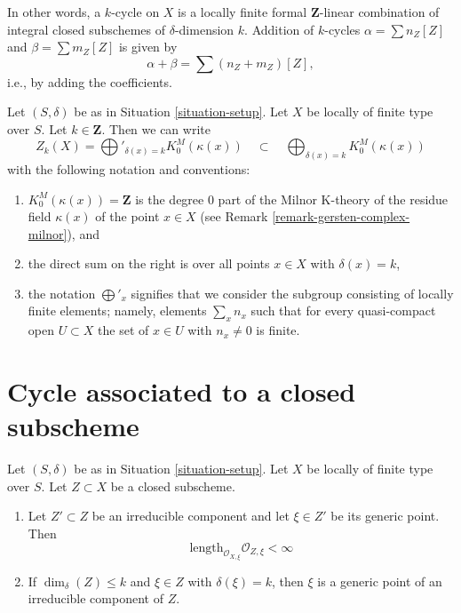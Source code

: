 \noindent
In other words, a $k$-cycle on $X$
is a locally finite formal $\mathbf{Z}$-linear
combination of integral closed subschemes of $\delta$-dimension $k$.
Addition of $k$-cycles $\alpha = \sum n_Z[Z]$ and
$\beta = \sum m_Z[Z]$ is given by
$$
\alpha + \beta = \sum (n_Z + m_Z)[Z],
$$
i.e., by adding the coefficients.

\begin{remark}
\label{remark-cycles-pointwise}
Let $(S, \delta)$ be as in Situation \ref{situation-setup}.
Let $X$ be locally of finite type over $S$. Let $k \in \mathbf{Z}$.
Then we can write
$$
Z_k(X) = \bigoplus'\nolimits_{\delta(x) = k} K_0^M(\kappa(x))
\quad\subset\quad
\bigoplus\nolimits_{\delta(x) = k} K_0^M(\kappa(x))
$$
with the following notation and conventions:
\begin{enumerate}
\item $K_0^M(\kappa(x)) = \mathbf{Z}$ is the degree $0$ part of
the Milnor K-theory of the residue field $\kappa(x)$ of the point
$x \in X$ (see Remark \ref{remark-gersten-complex-milnor}), and
\item the direct sum on the right is over all points $x \in X$
with $\delta(x) = k$,
\item the notation $\bigoplus'_x$ signifies that we consider the
subgroup consisting of locally finite elements; namely, elements
$\sum_x n_x$ such that for every quasi-compact open $U \subset X$
the set of $x \in U$ with $n_x \not = 0$ is finite.
\end{enumerate}
\end{remark}




\section{Cycle associated to a closed subscheme}
\label{section-cycle-of-closed-subscheme}

\begin{lemma}
\label{lemma-multiplicity-finite}
Let $(S, \delta)$ be as in Situation \ref{situation-setup}.
Let $X$ be locally of finite type over $S$.
Let $Z \subset X$ be a closed subscheme.
\begin{enumerate}
\item Let $Z' \subset Z$ be an irreducible component and
let $\xi \in Z'$ be its generic point.
Then
$$
\text{length}_{\mathcal{O}_{X, \xi}} \mathcal{O}_{Z, \xi} < \infty
$$
\item If $\dim_\delta(Z) \leq k$ and $\xi \in Z$ with
$\delta(\xi) = k$, then $\xi$ is a generic point of an
irreducible component of $Z$.
\end{enumerate}
\end{lemma}

